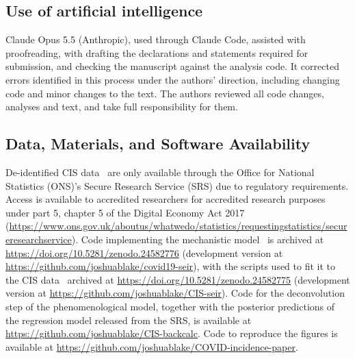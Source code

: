 \documentclass[9pt,twocolumn,twoside]{pnas-new}
\begin{document}
{\subsection*{Use of artificial intelligence}
Claude Opus 5.5 (Anthropic), used through Claude Code, assisted with proofreading, with drafting the declarations and statements required for submission, and checking the manuscript against the analysis code. It corrected errors identified in this process under the authors' direction, including changing code and minor changes to the text. The authors reviewed all code changes, analyses and text, and take full responsibility for them.

\subsection*{Data, Materials, and Software Availability}
De-identified CIS data~\citep{CIS} are only available through the Office for National Statistics (ONS)'s Secure Research Service (SRS) due to regulatory requirements. Access is available to accredited researchers for accredited research purposes under part 5, chapter 5 of the Digital Economy Act 2017 (\url{https://www.ons.gov.uk/aboutus/whatwedo/statistics/requestingstatistics/secureresearchservice}).
Code implementing the mechanistic model~\citep{covid19seirCode} is archived at \url{https://doi.org/10.5281/zenodo.24582776} (development version at \url{https://github.com/joshuablake/covid19-seir}), with the scripts used to fit it to the CIS data~\citep{CISseirCode} archived at \url{https://doi.org/10.5281/zenodo.24582775} (development version at \url{https://github.com/joshuablake/CIS-seir}).
Code for the deconvolution step of the phenomenological model, together with the posterior predictions of the regression model released from the SRS, is available at \url{https://github.com/joshuablake/CIS-backcalc}.
Code to reproduce the figures is available at \url{https://github.com/joshuablake/COVID-incidence-paper}.
}

\showmatmethods{} %
\end{document}
